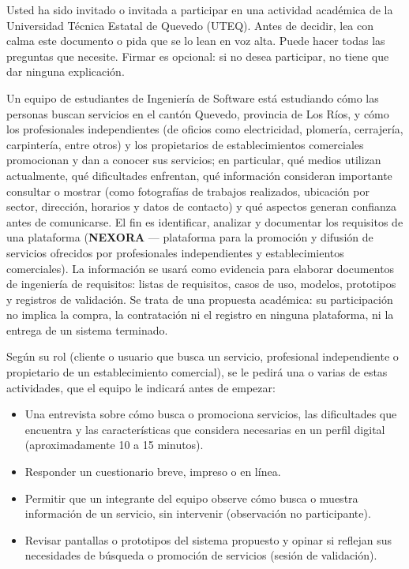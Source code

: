 \vspace{2pt}

{\small
Usted ha sido invitado o invitada a participar en una actividad acad\'emica de la Universidad T\'ecnica Estatal de Quevedo (UTEQ). Antes de decidir, lea con calma este documento o pida que se lo lean en voz alta. Puede hacer todas las preguntas que necesite. Firmar es opcional: si no desea participar, no tiene que dar ninguna explicaci\'on.


Un equipo de estudiantes de Ingenier\'ia de Software est\'a estudiando c\'omo las personas buscan servicios en el cant\'on Quevedo, provincia de Los R\'ios, y c\'omo los profesionales independientes (de oficios como electricidad, plomer\'ia, cerrajer\'ia, carpinter\'ia, entre otros) y los propietarios de establecimientos comerciales promocionan y dan a conocer sus servicios; en particular, qu\'e medios utilizan actualmente, qu\'e dificultades enfrentan, qu\'e informaci\'on consideran importante consultar o mostrar (como fotograf\'ias de trabajos realizados, ubicaci\'on por sector, direcci\'on, horarios y datos de contacto) y qu\'e aspectos generan confianza antes de comunicarse. El fin es identificar, analizar y documentar los requisitos de una plataforma (\textbf{NEXORA} --- plataforma para la promoci\'on y difusi\'on de servicios ofrecidos por profesionales independientes y establecimientos comerciales). La informaci\'on se usar\'a como evidencia para elaborar documentos de ingenier\'ia de requisitos: listas de requisitos, casos de uso, modelos, prototipos y registros de validaci\'on. Se trata de una propuesta acad\'emica: su participaci\'on no implica la compra, la contrataci\'on ni el registro en ninguna plataforma, ni la entrega de un sistema terminado.


Seg\'un su rol (cliente o usuario que busca un servicio, profesional independiente o propietario de un establecimiento comercial), se le pedir\'a una o varias de estas actividades, que el equipo le indicar\'a antes de empezar:
\begin{itemize}[leftmargin=1.5em, itemsep=2pt, topsep=2pt]
    \item Una entrevista sobre c\'omo busca o promociona servicios, las dificultades que encuentra y las caracter\'isticas que considera necesarias en un perfil digital (aproximadamente 10 a 15 minutos).
    \item Responder un cuestionario breve, impreso o en l\'inea.
    \item Permitir que un integrante del equipo observe c\'omo busca o muestra informaci\'on de un servicio, sin intervenir (observaci\'on no participante).
    \item Revisar pantallas o prototipos del sistema propuesto y opinar si reflejan sus necesidades de b\'usqueda o promoci\'on de servicios (sesi\'on de validaci\'on).
\end{itemize}

}
